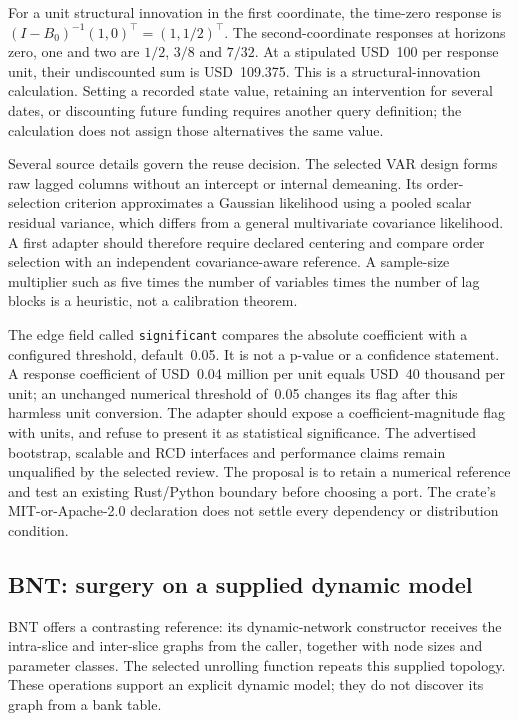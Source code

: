 For a unit structural innovation in the first coordinate, the time-zero
response is $(I-B_0)^{-1}(1,0)^\top=(1,1/2)^\top$.
The second-coordinate responses at horizons zero, one and two are
$1/2$, $3/8$ and $7/32$. At a stipulated USD~100 per response unit, their
undiscounted sum is USD~109.375. This is a structural-innovation calculation.
Setting a recorded state value, retaining an intervention for several dates,
or discounting future funding requires another query definition; the
calculation does not assign those alternatives the same value.
\citep{exec17_temporal_oracle}

Several source details govern the reuse decision. The selected VAR design
forms raw lagged columns without an intercept or internal demeaning.
Its order-selection criterion approximates a Gaussian likelihood using a
pooled scalar residual variance, which differs from a general multivariate
covariance likelihood. A first adapter should therefore require declared
centering and compare order selection with an independent covariance-aware
reference. A sample-size multiplier such as five times the number of variables
times the number of lag blocks is a heuristic, not a calibration theorem.
\citep{exec17_temporal_varlingam}

The edge field called \texttt{significant} compares the absolute coefficient
with a configured threshold, default~0.05. It is not a p-value or a
confidence statement. A response coefficient of USD~0.04 million per unit
equals USD~40 thousand per unit; an unchanged numerical threshold of~0.05
changes its flag after this harmless unit conversion. The adapter should
expose a coefficient-magnitude flag with units, and refuse to present it as
statistical significance. The advertised bootstrap, scalable and RCD
interfaces and performance claims remain unqualified by the selected review.
The proposal is to retain a numerical reference and test an existing
Rust/Python boundary before choosing a port. The crate's MIT-or-Apache-2.0
declaration does not settle every dependency or distribution condition.
\citep{exec17_temporal_varlingam,exec17_temporal_oracle}

\subsection{BNT: surgery on a supplied dynamic model}

BNT offers a contrasting reference: its dynamic-network constructor receives
the intra-slice and inter-slice graphs from the caller, together with node
sizes and parameter classes. The selected unrolling function repeats this
supplied topology. These operations support an explicit dynamic model; they
do not discover its graph from a bank table.
\citep{exec17_temporal_bnt}

